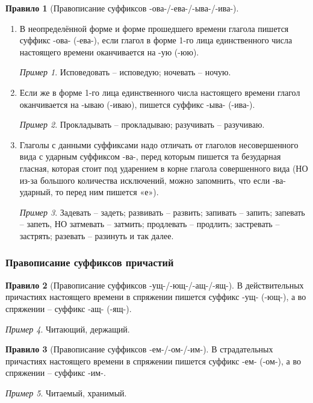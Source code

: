 \documentclass[12pt]{article}
\theoremstyle{definition}
\newtheorem{rrule}{Правило}[section]
\theoremstyle{remark}
\newtheorem*{example}{Пример}
\newcommand{\romannumeralcaps}[1]
    {\MakeUppercase{\romannumeral #1}}
\begin{document}
\begin{rrule}[Правописание суффиксов -ова-/-ева-/-ыва-/-ива-]
    \hfill
    \begin{enumerate}
        \item В неопределённой форме и форме прошедшего времени глагола пишется суффикс -ова- (-ева-), если глагол в форме 1-го лица единственного числа настоящего времени оканчивается на -ую (-юю).
        \begin{example}
            Исповедовать -- исповедую; ночевать -- ночую.
        \end{example}
        \item Если же в форме 1-го лица единственного числа настоящего времени глагол оканчивается на -ываю (-иваю), пишется суффикс -ыва- (-ива-).
        \begin{example}
            Прокладывать -- прокладываю; разучивать -- разучиваю.
        \end{example}
        \item Глаголы с данными суффиксами надо отличать от глаголов несовершенного вида с ударным суффиксом -ва-, перед которым пишется та безударная гласная, которая стоит под ударением в корне глагола совершенного вида (НО из-за большого количества исключений, можно запомнить, что если -ва- ударный, то перед ним пишется «е»).
        \begin{example}
            Задевать -- задеть; развивать -- развить; запивать -- запить; запевать -- запеть, НО затмевать -- затмить; продлевать -- продлить; застревать -- застрять; разевать -- разинуть и так далее.
        \end{example}
    \end{enumerate}
\end{rrule}

\subsubsection{Правописание суффиксов причастий}

\begin{rrule}[Правописание суффиксов -ущ-/-ющ-/-ащ-/-ящ-]
    В действительных причастиях настоящего времени в \romannumeralcaps{1} спряжении пишется суффикс -ущ- (-ющ-), а во \romannumeralcaps{2} спряжении – суффикс -ащ- (-ящ-).
    \begin{example}
        Читающий, держащий.
    \end{example}
\end{rrule}

\begin{rrule}[Правописание суффиксов -ем-/-ом-/-им-]
    В страдательных причастиях настоящего времени в \romannumeralcaps{1} спряжении пишется суффикс -ем- (-ом-), а во \romannumeralcaps{2} спряжении – суффикс -им-.
    \begin{example}
        Читаемый, хранимый.
    \end{example}
\end{rrule}
\end{document}
